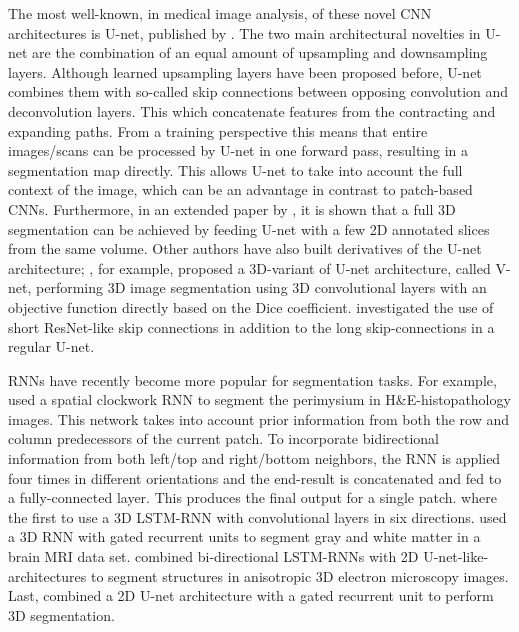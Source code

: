 \documentclass{nitk}
\begin{document}
    The most well-known, in medical image analysis, of these
novel CNN architectures is U-net, published by \citet{ronneberger2015u}. The two main architectural novelties in U- net are the combination of an equal amount of upsampling and downsampling layers. Although learned upsampling layers have been proposed before, U-net combines them with so-called skip connections between opposing convolution and deconvolution layers. This which concatenate features from the contracting and expanding paths. From a training perspective this means that entire images/scans can be processed by U-net in one forward pass, resulting in a segmentation map directly. This allows U-net to take into account the full context of the image, which can be an advantage in contrast to patch-based CNNs. Furthermore, in an extended paper by \citet{cciccek20163d} , it is shown that a full 3D segmentation can be achieved by feeding U-net with a few 2D annotated slices from the same volume. Other authors have also built derivatives of the U-net architecture; \citet{milletari2016v}, for example, proposed a 3D-variant of U-net architecture, called V-net, performing 3D image segmentation using 3D convolutional layers with an objective function directly based on the Dice coefficient. \citet{drozdzal2016importance} investigated the use of short ResNet-like skip connections in addition to the long skip-connections in a regular U-net. \\ \par

RNNs have recently become more popular for segmentation
tasks. For example, \citet{xie2016spatial} used a spatial clockwork RNN to segment the perimysium in H&E-histopathology images. This network takes into account prior information from both the row and column predecessors of the current patch. To incorporate bidirectional information from both left/top and right/bottom neighbors, the RNN is applied four times in different orientations and the end-result is concatenated and fed to a fully-connected layer. This produces the final output for a single patch. \citet{stollenga2015parallel} where the first to use a 3D LSTM-RNN with convolutional layers in six directions. \citet{andermatt2016multi} used a 3D RNN with gated recurrent units to segment gray and white matter in a brain MRI data set. \citet{chen2016dcan} combined bi-directional LSTM-RNNs with 2D U-net-like-architectures to segment structures in anisotropic 3D electron microscopy images. Last, \citet{poudel2016recurrent} combined a 2D U-net architecture with a gated recurrent unit to perform 3D segmentation. \\ \par
\end{document}
